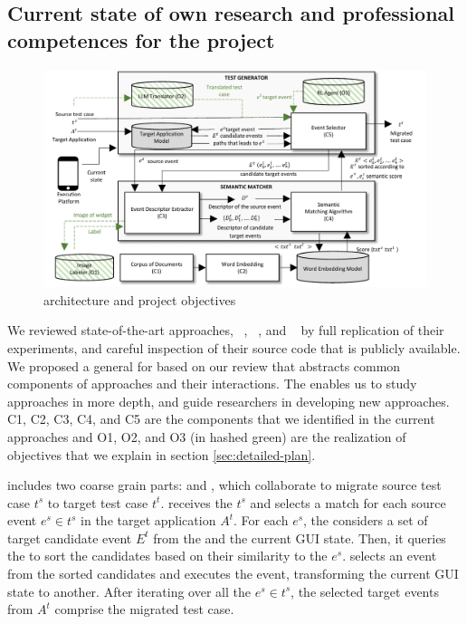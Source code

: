 	
\subsection{Current state of own research and professional competences for the project}
\label{sec:own-research}

\begin{figure}[h]
	\centering
	\includegraphics[width=\textwidth]{images/architecture.pdf}
	\caption{\testreuse architecture and project objectives}
	\label{fig:architecture}
\end{figure}

We reviewed state-of-the-art \testreuse approaches, \craftdroid~\cite{lin:craftdroid:ASE:2019}, \atm~\cite{behrang:apptestmigrator:ASE:2019}, and \adaptdroid~\cite{Mariani:Adaptdroid:AST:2021} by full replication of their experiments, and careful inspection of their source code that is publicly available.
We proposed a general \architecture for \testreuse based on our review that abstracts common components of \testreuse approaches and their interactions. 
The \architecture enables us to study \testreuse approaches in more depth, and guide researchers in developing new approaches.
C1, C2, C3, C4, and C5 are the components that we identified in the current approaches and O1, O2, and O3 (in hashed green) are the realization of \project objectives that we explain in section \ref{sec:detailed-plan}. 


\bigskip
\testreuse  includes two coarse grain parts: \generator and \matcher, which collaborate to migrate source test case $t^s$ to target test case $t^t$.
\generator receives the $t^s$ and selects a match for each source event $e^s \in t^s$ in the target application $A^t$.
For each $e^s$, the \generator considers a set of target candidate event $E^t$ from the \tam and the current GUI state. 
Then, it queries the \matcher to sort the candidates based on their similarity to the $e^s$.
\generator selects an event from the sorted candidates and executes the event, transforming the current GUI state to another. 
After iterating over all the $e^s \in t^s$, the selected target events from $A^t$ comprise the migrated test case.



